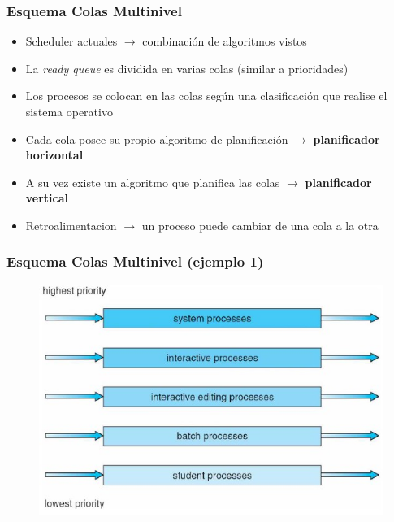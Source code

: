 \begin{frame}
  \frametitle{Esquema \textbf{Colas Multinivel}}
  \begin{itemize}
  		\item Scheduler actuales $\rightarrow$ combinación de algoritmos vistos
		\item La \emph{ready queue} es dividida en varias colas (similar a prioridades)		
		\item Los procesos se colocan en las colas según una clasificación que realise el sistema operativo
		\item Cada cola posee su propio algoritmo de planificación $\rightarrow$ \textbf{planificador horizontal}
		\item A su vez existe un algoritmo que planifica las colas $\rightarrow$ \textbf{planificador vertical}
		\item Retroalimentacion $\rightarrow$ un proceso puede cambiar de una cola a la otra
  \end{itemize}
\end{frame}

\begin{frame}
  \frametitle{Esquema \textbf{Colas Multinivel} (ejemplo 1)}
	\begin{figure}
	    \includegraphics[scale=0.4]{images/multilevelSchemaExample1.png}
	\end{figure}
\end{frame}

